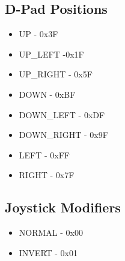 \documentclass[11pt]{article} %
\begin{document}
\newpage

\subsection{D-Pad Positions}

\begin{itemize}
\item UP - 0x3F
\item UP\_LEFT -0x1F
\item UP\_RIGHT - 0x5F
\item DOWN - 0xBF
\item DOWN\_LEFT - 0xDF
\item DOWN\_RIGHT - 0x9F
\item LEFT - 0xFF
\item RIGHT - 0x7F
\end{itemize}

\subsection{Joystick Modifiers}

\begin{itemize}
\item NORMAL - 0x00
\item INVERT - 0x01
\end{itemize}
\end{document}
